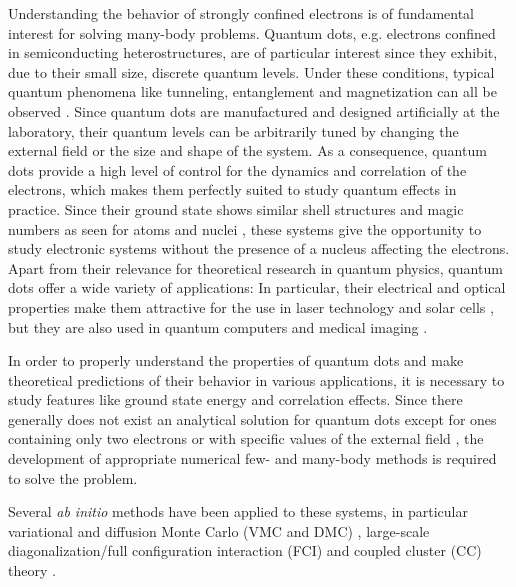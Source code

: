 \documentclass[amsmath, amssymb, aps, floatfix, nofootinbib, preprintnumbers,showpacs, superscriptaddress, twocolumn]{revtex4-1}
\begin{document}
Understanding the behavior of strongly confined electrons is of fundamental
interest for solving many-body problems.  Quantum dots, e.g. electrons
confined in semiconducting heterostructures, are of particular interest since
they exhibit, due to their small size, discrete quantum levels.  Under these
conditions, typical quantum phenomena like tunneling, entanglement and
magnetization can all be observed \cite{reimann2002,engel1993}.  Since quantum
dots are manufactured and designed artificially at the laboratory, their
quantum levels can be arbitrarily tuned by changing the external field or the
size and shape of the system.  As a consequence, quantum dots provide a high
level of control for the dynamics and correlation of the electrons, which
makes them perfectly suited to study quantum effects in practice.  Since their
ground state shows similar shell structures and magic numbers as seen for
atoms and nuclei \cite{tarucha1996}, these systems give the opportunity to
study electronic systems without the presence of a nucleus affecting the
electrons.  Apart from their relevance for theoretical research in quantum
physics, quantum dots offer a wide variety of applications: In particular,
their electrical and optical properties make them attractive for the use in
laser technology \cite{strauf2010,5075760} and solar cells
\cite{jenks:013111,doi:10.1021/cr900289f}, but they are also used in quantum
computers\cite{PhysRevA.57.120} and medical imaging \cite{Ben-Ari02042003}.

In order to properly understand the properties of quantum dots and make
theoretical predictions of their behavior in various applications, it is
necessary to study features like ground state energy and correlation
effects. Since there generally does not exist an analytical solution for
quantum dots except for ones containing only two electrons or with specific
values of the external field \cite{PhysRevA.48.3561}, the development of
appropriate numerical few- and many-body methods is required to solve the
problem.

Several \textit{ab initio} methods have been applied to these systems, in
particular variational and diffusion Monte Carlo (VMC and DMC)
\cite{PhysRevB.68.035304,%
  PhysRevB.62.8120,PhysRevB.84.115302,PhysRevB.54.4780}, large-scale
diagonalization/full configuration interaction (FCI)
\cite{JJAP.36.3924,PhysRevB.56.6428,Kvaalcode,rontani:124102} and coupled
cluster (CC) theory \cite{PhysRevB.67.045320,heidari:114708,%
  PhysRevB.84.115302}.
\end{document}
